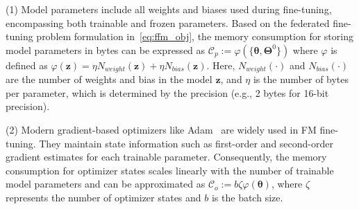 \documentclass[sigconf]{acmart}
\begin{document}
(1) Model parameters include all weights and biases used during fine-tuning, encompassing both trainable and frozen parameters. Based on the federated fine-tuning problem formulation in~\eqref{eq:ffm_obj}, 
the memory consumption for storing model parameters in bytes can be expressed as $\mathcal{C}_p:=\varphi(\{\boldsymbol{\theta}, \boldsymbol{\Theta}^0\}) $ where $ \varphi$ is defined as $\varphi(\boldsymbol{z}) =\eta N_{weight}(\boldsymbol{z})+\eta N_{bias}(\boldsymbol{z})$. Here, $N_{weight}(\cdot)$ and $N_{bias}(\cdot)$ are the number of weights and bias in the model $\boldsymbol{z}$, and $\eta$ is the number of bytes per parameter, which is determined by the precision (e.g., 2 bytes for 16-bit precision). 

(2) Modern gradient-based optimizers like Adam~\cite{kingma2014adam} are widely used in FM fine-tuning. They maintain state information such as first-order and second-order gradient estimates for each trainable parameter. 
Consequently, the memory consumption for optimizer states scales linearly with the number of trainable model parameters and can be approximated as $\mathcal{C}_o:=b\zeta\varphi(\boldsymbol{\theta})$, where $\zeta$ represents the number of optimizer states and $b$ is the batch size.
\end{document}
